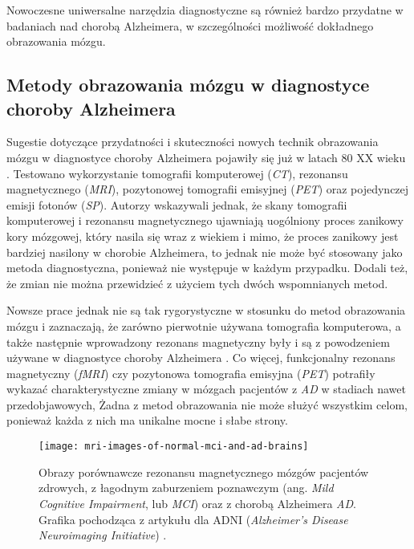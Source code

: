 Nowoczesne uniwersalne narzędzia diagnostyczne są również bardzo przydatne w badaniach nad chorobą Alzheimera, w szczególności możliwość dokładnego obrazowania mózgu.

\subsection{Metody obrazowania mózgu w diagnostyce choroby Alzheimera}

Sugestie dotyczące przydatności i skuteczności nowych technik obrazowania mózgu w diagnostyce choroby Alzheimera pojawiły się już w latach 80 XX wieku \cite{mcgeer1986brain}.
Testowano wykorzystanie tomografii komputerowej (\emph{CT}), rezonansu magnetycznego (\emph{MRI}), pozytonowej tomografii emisyjnej (\emph{PET}) oraz pojedynczej emisji fotonów (\emph{SP}).
Autorzy wskazywali jednak, że skany tomografii komputerowej i rezonansu magnetycznego ujawniają uogólniony proces zanikowy kory mózgowej, który nasila się wraz z wiekiem i mimo, że proces zanikowy jest bardziej nasilony w chorobie Alzheimera, to jednak nie może być stosowany jako metoda diagnostyczna, ponieważ nie występuje w każdym przypadku.
Dodali też, że zmian nie można przewidzieć z użyciem tych dwóch wspomnianych metod.

Nowsze prace jednak nie są tak rygorystyczne w stosunku do metod obrazowania mózgu i zaznaczają, że zarówno pierwotnie używana tomografia komputerowa, a także następnie wprowadzony rezonans magnetyczny były i są z powodzeniem używane w diagnostyce choroby Alzheimera \cite{johnson2012brain}.
Co więcej, funkcjonalny rezonans magnetyczny (\emph{fMRI}) czy pozytonowa tomografia emisyjna (\emph{PET}) potrafiły wykazać charakterystyczne zmiany w mózgach pacjentów z \emph{AD} w stadiach nawet przedobjawowych,
Żadna z metod obrazowania nie może służyć wszystkim celom, ponieważ każda z nich ma unikalne mocne i słabe strony.

\begin{figure}[ht]
  \texttt{[image: mri-images-of-normal-mci-and-ad-brains]}
  \caption[Obrazy porównawcze rezonansu magnetycznego mózgów pacjentów z chorobą Alzheimera oraz zdrowych]{Obrazy porównawcze rezonansu magnetycznego mózgów pacjentów zdrowych, z łagodnym zaburzeniem poznawczym (ang. \emph{Mild Cognitive Impairment}, lub \emph{MCI}) oraz z chorobą Alzheimera \emph{AD}. Grafika pochodząca z artykułu dla ADNI (\emph{Alzheimer's Disease Neuroimaging Initiative}) \cite{chandra2019magnetic}.}
  \label{mri-images-of-normal-mci-and-ad-brains}
\end{figure}

